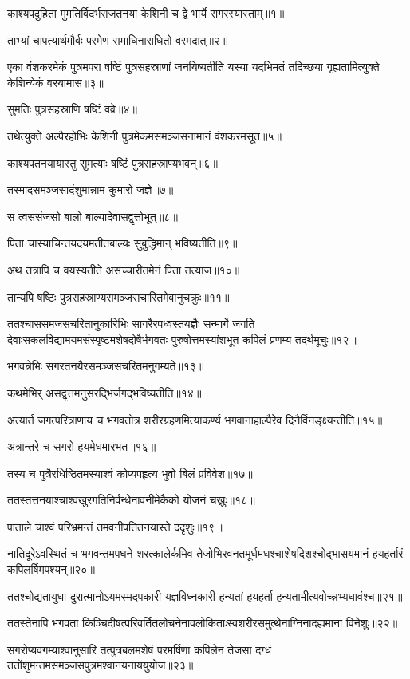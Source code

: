 

काश्यपदुहिता मुमतिर्विदर्भराजतनया केशिनी च द्वे भार्ये सगरस्यास्ताम्॥१॥

ताभ्यां चापत्यार्थमौर्वः परमेण समाधिनाराधितो वरमदात्॥२॥

एका वंशकरमेकं पुत्रमपरा षष्टिं पुत्रसहस्राणां जनयिष्यतीति यस्या यदभिमतं तदिच्छया
गृह्यतामित्युक्ते केशिन्येकं वरयामास॥३॥

सुमतिः पुत्रसहस्राणि षष्टिं वव्रे॥४॥

तथेत्युक्ते अल्पैरहोभिः केशिनी पुत्रमेकमसमञ्जसनामानं वंशकरमसूत॥५॥

काश्यपतनयायास्तु सुमत्याः षष्टिं पुत्रसहस्राण्यभवन्॥६॥

तस्मादसमञ्जसादंशुमान्नाम कुमारो जज्ञे॥७॥

स त्वससंजसो बालो बाल्यादेवासद्वृत्तोभूत्॥८॥

पिता चास्याचिन्तयदयमतीतबाल्यः सुबुद्धिमान् भविष्यतीति॥९॥

अथ तत्रापि च वयस्यतीते असच्चारीतमेनं पिता तत्याज॥१०॥

तान्यपि षष्टिः पुत्रसहस्राण्यसमञ्जसचारितमेवानुचक्रुः॥११॥

ततश्चाससमजसचरितानुकारिभिः सागरैरपध्वस्तयज्ञैः सन्मार्गे जगति
देवाःसकलविद्यामयमसंस्पृष्टमशेषदोषैर्भगवतः पुरुषोत्तमस्यांशभूत कपिलं प्रणम्य तदर्थमूचुः॥१२॥

भगवन्नेभिः सगरतनयैरसमञ्जसचरितमनुगम्यते॥१३॥

कथमेभिर् असद्वृत्तमनुसरद्भिर्जगद्भविष्यतीति॥१४॥

अत्यार्त जगत्परित्राणाय च भगवतोत्र शरीरग्रहणमित्याकर्ण्य भगवानाहाल्पैरेव
दिनैर्विनङ्क्ष्यन्तीति॥१५॥

अत्रान्तरे च सगरो हयमेधमारभत॥१६॥

तस्य च पुत्रैरधिष्ठितमस्याश्वं कोप्यपहृत्य भुवो बिलं प्रविवेश॥१७॥

ततस्तत्तनयाश्चाश्वखुरगतिनिर्वन्धेनावनीमेकैको योजनं चख्नुः॥१८॥

पाताले चाश्वं परिभ्रमन्तं तमवनीपतितनयास्ते ददृशुः॥१९॥

नातिदूरेऽवस्थितं च भगवन्तमपघने शरत्कालेर्कमिव तेजोभिरवनतमूर्धमधश्चाशेषदिशश्चोद्भासयमानं
हयहर्तारं कपिलर्षिमपश्यन्॥२०॥

ततश्चोद्यतायुधा दुरात्मानोऽयमस्मदपकारी यज्ञविध्नकारी हन्यतां हयहर्ता
हन्यतामीत्यवोच्न्नभ्यधावंश्च॥२१॥

ततस्तेनापि भगवता किञ्चिदीषत्परिवर्तितलोचनेनावलोकिताःस्वशरीरसमुत्थेनाग्निनादह्यमाना
विनेशुः॥२२॥

सगरोप्यवगम्याश्वानुसारि तत्पुत्रबलमशेषं परमर्षिणा कपिलेन तेजसा दग्धं
ततोंशुमन्तमसमञ्जसपुत्रमश्वानयनाययुयोज॥२३॥

